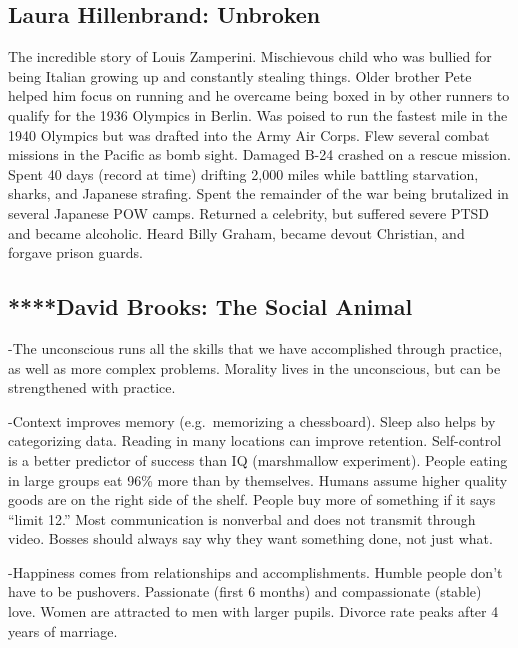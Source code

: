 \documentclass[
]{article}
\begin{document}
\hypertarget{laura-hillenbrand-unbroken}{%
\subsection{Laura Hillenbrand:
Unbroken}\label{laura-hillenbrand-unbroken}}

The incredible story of Louis Zamperini. Mischievous child who was
bullied for being Italian growing up and constantly stealing things.
Older brother Pete helped him focus on running and he overcame being
boxed in by other runners to qualify for the 1936 Olympics in Berlin.
Was poised to run the fastest mile in the 1940 Olympics but was drafted
into the Army Air Corps. Flew several combat missions in the Pacific as
bomb sight. Damaged B-24 crashed on a rescue mission. Spent 40 days
(record at time) drifting 2,000 miles while battling starvation, sharks,
and Japanese strafing. Spent the remainder of the war being brutalized
in several Japanese POW camps. Returned a celebrity, but suffered severe
PTSD and became alcoholic. Heard Billy Graham, became devout Christian,
and forgave prison guards.

\hypertarget{david-brooks-the-social-animal}{%
\subsection{****David Brooks: The Social
Animal}\label{david-brooks-the-social-animal}}

-The unconscious runs all the skills that we have accomplished through
practice, as well as more complex problems. Morality lives in the
unconscious, but can be strengthened with practice.

-Context improves memory (e.g.~memorizing a chessboard). Sleep also
helps by categorizing data. Reading in many locations can improve
retention. Self-control is a better predictor of success than IQ
(marshmallow experiment). People eating in large groups eat 96\% more
than by themselves. Humans assume higher quality goods are on the right
side of the shelf. People buy more of something if it says ``limit 12.''
Most communication is nonverbal and does not transmit through video.
Bosses should always say why they want something done, not just what.

-Happiness comes from relationships and accomplishments. Humble people
don't have to be pushovers. Passionate (first 6 months) and
compassionate (stable) love. Women are attracted to men with larger
pupils. Divorce rate peaks after 4 years of marriage.
\end{document}
